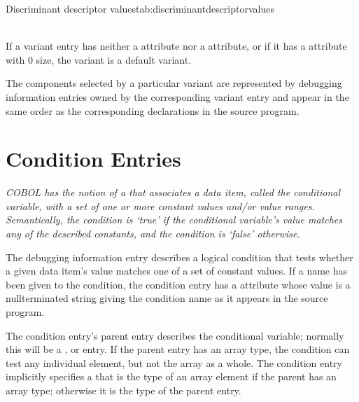 \begin{simplenametable}[1.4in]{Discriminant descriptor values}{tab:discriminantdescriptorvalues}
 \\
 \\
\end{simplenametable}

If a variant entry has neither a 
attribute nor a  attribute, or if it has
a  attribute with 0 size, the variant is a
default variant.

The components selected by a particular variant are represented
by debugging information entries owned by the corresponding
variant entry and appear in the same order as the corresponding
declarations in the source program.

\section{Condition Entries}
\label{chap:conditionentries}

\textit{COBOL has the notion of 
a  that
associates a data item, called the conditional variable, with
a set of one or more constant values and/or value ranges.
Semantically, the condition is \textquoteleft true\textquoteright{}
if the conditional
variable's value matches any of the described constants,
and the condition is \textquoteleft false\textquoteright{} otherwise.}

The 
debugging information entry
describes a
logical condition that tests whether a given data item\textquoteright s
value matches one of a set of constant values. If a name
has been given to the condition, the condition entry has a
 attribute
whose value is a null\dash terminated string
giving the condition name as it appears in the source program.

The condition entry's parent entry describes the conditional
variable; normally this will be a ,
 or 
 entry.
If 
the parent
entry has an array type, the condition can test any individual
element, but not the array as a whole. The condition entry
implicitly specifies a  that is the
type of an array element if the parent has an array type;
otherwise it is the type of the parent entry.

